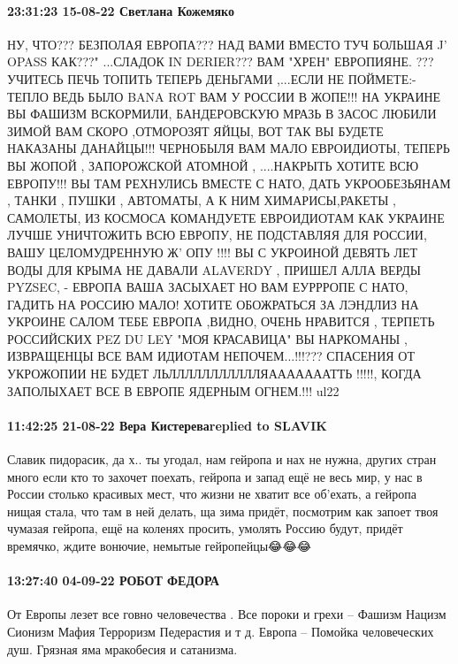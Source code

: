  
 
 
 
 

\paragraph{23:31:23 15-08-22 Светлана Кожемяко}

\obeycr
НУ, ЧТО??? БЕЗПОЛАЯ ЕВРОПА???
НАД ВАМИ ВМЕСТО ТУЧ
БОЛЬШАЯ J' OPASS
КАК???" ...СЛАДОК IN DERIER??? ВАМ "ХРЕН" ЕВРОПИЯНЕ. ???
УЧИТЕСЬ ПЕЧЬ ТОПИТЬ ТЕПЕРЬ
ДЕНЬГАМИ ,...ЕСЛИ НЕ ПОЙМЕТЕ:-
ТЕПЛО ВЕДЬ БЫЛО BANA ROT
ВАМ У РОССИИ В ЖОПЕ!!!
НА УКРАИНЕ ВЫ ФАШИЗМ ВСКОРМИЛИ,
БАНДЕРОВСКУЮ МРАЗЬ В ЗАСОС
ЛЮБИЛИ
ЗИМОЙ ВАМ СКОРО ,ОТМОРОЗЯТ ЯЙЦЫ,
ВОТ ТАК ВЫ БУДЕТЕ НАКАЗАНЫ ДАНАЙЦЫ!!!
ЧЕРНОБЫЛЯ ВАМ МАЛО ЕВРОИДИОТЫ,
ТЕПЕРЬ ВЫ ЖОПОЙ , ЗАПОРОЖСКОЙ АТОМНОЙ ,
....НАКРЫТЬ ХОТИТЕ ВСЮ ЕВРОПУ!!!
ВЫ ТАМ РЕХНУЛИСЬ ВМЕСТЕ С НАТО,
ДАТЬ УКРООБЕЗЬЯНАМ , ТАНКИ , ПУШКИ , АВТОМАТЫ,
А К НИМ ХИМАРИСЫ,РАКЕТЫ , САМОЛЕТЫ,
ИЗ КОСМОСА КОМАНДУЕТЕ ЕВРОИДИОТАМ
КАК УКРАИНЕ ЛУЧШЕ УНИЧТОЖИТЬ
ВСЮ ЕВРОПУ, НЕ ПОДСТАВЛЯЯ ДЛЯ РОССИИ, ВАШУ ЦЕЛОМУДРЕННУЮ
Ж' ОПУ !!!!
ВЫ С УКРОИНОЙ ДЕВЯТЬ ЛЕТ
ВОДЫ ДЛЯ КРЫМА НЕ ДАВАЛИ
ALAVERDY , ПРИШЕЛ АЛЛА ВЕРДЫ
PYZSEC, - ЕВРОПА ВАША ЗАСЫХАЕТ
НО ВАМ ЕУРРРОПЕ С НАТО,
ГАДИТЬ НА РОССИЮ МАЛО!
ХОТИТЕ ОБОЖРАТЬСЯ
ЗА ЛЭНДЛИЗ НА УКРОИНЕ САЛОМ
ТЕБЕ ЕВРОПА ,ВИДНО,
ОЧЕНЬ НРАВИТСЯ ,
ТЕРПЕТЬ РОССИЙСКИХ
PEZ DU LEY
"МОЯ КРАСАВИЦА"
ВЫ НАРКОМАНЫ , ИЗВРАЩЕНЦЫ
ВСЕ ВАМ ИДИОТАМ НЕПОЧЕМ...!!!???
СПАСЕНИЯ ОТ УКРОЖОПИИ НЕ БУДЕТ
ЛЬЛЛЛЛЛЛЛЛЛЛЛЯАААААААТТЬ !!!!!,
КОГДА ЗАПОЛЫХАЕТ ВСЕ В ЕВРОПЕ
ЯДЕРНЫМ ОГНЕМ.!!!
ul22
\restorecr

\paragraph{11:42:25 21-08-22 Вера Кистереваreplied to SLAVIK}

Славик пидорасик, да х.. ты угодал, нам гейропа и нах не нужна, других стран
много если кто то захочет поехать, гейропа и запад ещё не весь мир, у нас в
России столько красивых мест, что жизни не хватит все об'ехать, а гейропа нищая
стала, что там в ней делать, ща зима придёт, посмотрим как запоет твоя чумазая
гейропа, ещё на коленях просить, умолять Россию будут, придёт времячко, ждите
вонючие, немытые гейропейцы😂😂😂

\paragraph{13:27:40 04-09-22 РОБОТ ФЕДОРА}

От Европы лезет все говно человечества .
Все пороки и грехи --
Фашизм
Нацизм
Сионизм
Мафия
Терроризм
Педерастия и т д.
Европа --
Помойка человеческих душ.
Грязная яма
мракобесия и сатанизма.

